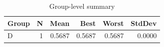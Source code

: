 \begin{table}[htbp]
\centering
\caption{Group-level summary}
\label{tab:group-summary}
\begin{tabular}{lrrrrr}
\toprule
\textbf{Group} & \textbf{N} & \textbf{Mean} & \textbf{Best} & \textbf{Worst} & \textbf{StdDev} \\
\midrule
D & 1 & 0.5687 & 0.5687 & 0.5687 & 0.0000 \\
\bottomrule
\end{tabular}
\end{table}